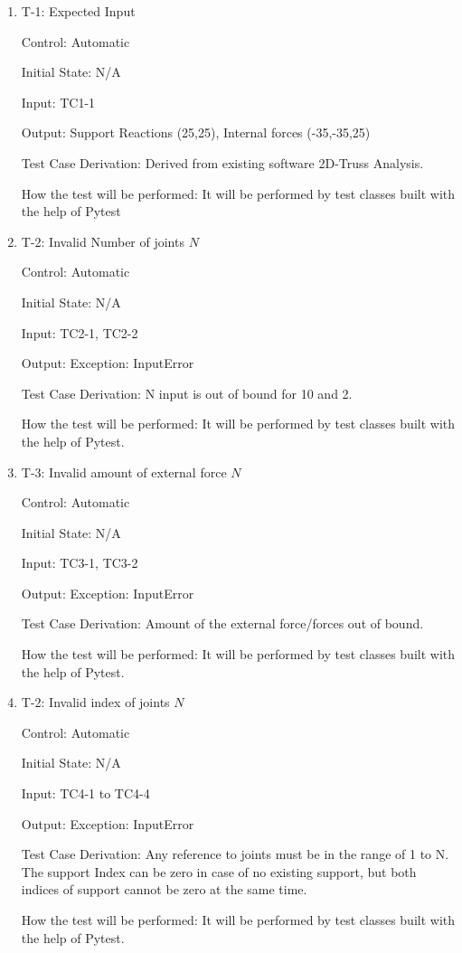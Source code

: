 \documentclass[12pt, titlepage]{article}
\begin{document}
\begin{enumerate}

\item{T-1: Expected Input\\}

Control: Automatic
					
Initial State: N/A
					
Input: TC1-1
					
Output: Support Reactions (25,25), Internal forces (-35,-35,25)

Test Case Derivation: Derived from existing software 2D-Truss Analysis.
					
How the test will be performed: It will be performed by test classes built with the help of Pytest
					
\item{T-2: Invalid Number of joints $N$\\}

Control: Automatic
					
Initial State: N/A
					
Input: TC2-1, TC2-2
					
Output: Exception: InputError

Test Case Derivation: N input is out of bound for 10 and 2.

How the test will be performed: It will be performed by test classes built with the help of Pytest.
\item{T-3: Invalid amount of external force $N$\\}

Control: Automatic
					
Initial State: N/A
					
Input: TC3-1, TC3-2
					
Output: Exception: InputError

Test Case Derivation: Amount of the external force/forces out of bound. 

How the test will be performed: It will be performed by test classes built with the help of Pytest.
\item{T-2: Invalid index of joints $N$\\}

Control: Automatic
					
Initial State: N/A
					
Input: TC4-1 to TC4-4
					
Output: Exception: InputError

Test Case Derivation: Any reference to joints must be in the range of 1 to N. The support Index can be zero in case of no existing support, but both indices of support cannot be zero at the same time.

How the test will be performed: It will be performed by test classes built with the help of Pytest.


\end{enumerate}
\end{document}
